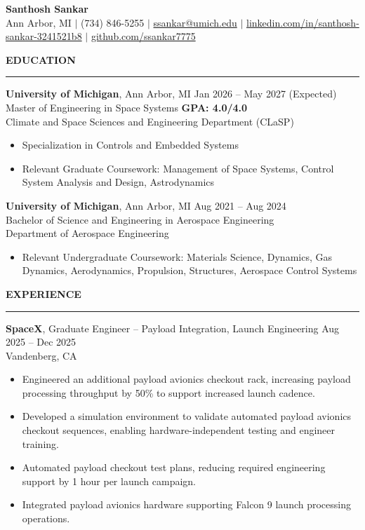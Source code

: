 \documentclass[10pt]{article}
\newcommand{\ressection}[1]{
  \vspace{0.45em}
  {\large\bfseries #1}\par
  \vspace{0.12em}\hrule\vspace{0.32em}
}
\begin{document}
\begin{center}
{\LARGE {\bfseries Santhosh Sankar}} \\
Ann Arbor, MI \enspace $\vert$ \enspace (734) 846-5255 \enspace $\vert$ \enspace
\href{mailto:ssankar@umich.edu}{ssankar@umich.edu} \enspace $\vert$ \enspace
\href{https://www.linkedin.com/in/santhosh-sankar-3241521b8/}{linkedin.com/in/santhosh-sankar-3241521b8} \enspace $\vert$ \enspace
\href{https://github.com/ssankar7775}{github.com/ssankar7775}
\end{center}

\ressection{EDUCATION}

{\bfseries University of Michigan}, Ann Arbor, MI \hfill Jan 2026 -- May 2027 (Expected) \\
Master of Engineering in Space Systems \hfill {\bfseries GPA: 4.0/4.0} \\
Climate and Space Sciences and Engineering Department (CLaSP)

\begin{itemize}
  \item Specialization in Controls and Embedded Systems
  \item Relevant Graduate Coursework: Management of Space Systems, Control System Analysis and Design, Astrodynamics
\end{itemize}

{\bfseries University of Michigan}, Ann Arbor, MI \hfill Aug 2021 -- Aug 2024 \\
Bachelor of Science and Engineering in Aerospace Engineering \\
Department of Aerospace Engineering

\begin{itemize}
  \item Relevant Undergraduate Coursework: Materials Science, Dynamics, Gas Dynamics, Aerodynamics, Propulsion, Structures, Aerospace Control Systems
\end{itemize}

\ressection{EXPERIENCE}

{\bfseries SpaceX}, Graduate Engineer -- Payload Integration, Launch Engineering \hfill Aug 2025 -- Dec 2025 \\
Vandenberg, CA
\begin{itemize}
\item Engineered an additional payload avionics checkout rack, increasing payload processing throughput by 50\% to support increased launch cadence.
\item Developed a simulation environment to validate automated payload avionics checkout sequences, enabling hardware-independent testing and engineer training.
\item Automated payload checkout test plans, reducing required engineering support by 1 hour per launch campaign.
\item Integrated payload avionics hardware supporting Falcon 9 launch processing operations.
\end{itemize}
\end{document}
